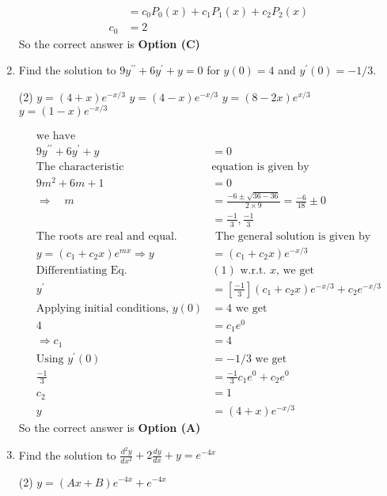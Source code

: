 \begin{enumerate}[label=\color{ocre}\textbf{\arabic*.}]
\begin{answer}
$$\begin{aligned}
	&=c_{0} P_{0}(x)+c_{1} P_{1}(x)+c_{2} P_{2}(x)\\ c_{0}&=2
	\end{aligned}
	$$
	So the correct answer is \textbf{Option (C)}
\end{answer}
\item Find the solution to $9 y^{\prime \prime}+6 y^{\prime}+y=0$ for $y(0)=4$ and $y^{\prime}(0)=-1 / 3$.
\begin{tasks}(2)
	\task[\textbf{a.}]$y=(4+x) e^{-x / 3}$
	\task[\textbf{b.}]$y=(4-x) e^{-x / 3}$
	\task[\textbf{c.}]$y=(8-2 x) e^{x / 3}$
	\task[\textbf{d.}]$y=(1-x) e^{-x / 3}$ 
\end{tasks}
\begin{answer}
	$$
	\begin{aligned}
	\text{we have}&\\
	9 y^{\prime \prime}+6 y^{\prime}+y&=0\\
	\text{The characteristic }&\text{equation is given by}\\
	9 m^{2}+6 m+1&=0 \\
	\Rightarrow \quad m&=\frac{-6 \pm \sqrt{36-36}}{2 \times 9}=\frac{-6}{18} \pm 0 \\
	&=\frac{-1}{3}, \frac{-1}{3}\\
	\text{The roots are real and equal.}&\text{ The general solution is given by}\\
	y=\left(c_{1}+c_{2} x\right) e^{m x} \Rightarrow y&=\left(c_{1}+c_{2} x\right) e^{-x / 3}\\
	\text{Differentiating Eq. }&(1)\text{ w.r.t. $x$, we get}\\
	y^{\prime}&=\left[\frac{-1}{3}\right]\left(c_{1}+c_{2} x\right) e^{-x / 3}+c_{2} e^{-x / 3}\\
	\text{Applying initial conditions, }y(0)&=4  \text{ we get}\\
	4 &= c_{1}e^{0}\\
	\Rightarrow c_{1} &=4\\
	\text{Using }y^{\prime}(0)&=-1 / 3\text{ we get}\\
	\frac{-1}{3}&=\frac{-1}{3} c_{1}e^{0}+c_{2} e^{0}\\
	c_{2}&=1\\
	y&=(4+x) e^{-x / 3}
	\end{aligned}
	$$
	So the correct answer is \textbf{Option (A)}
\end{answer}
\item Find the solution to $\frac{d^{2} y}{d x^{2}}+2 \frac{d y}{d x}+y=e^{-4 x}$
\begin{tasks}(2)
	\task[\textbf{a.}]$y=(A x+B) e^{-4 x}+e^{-4 x}$

\end{tasks}
\end{enumerate}
